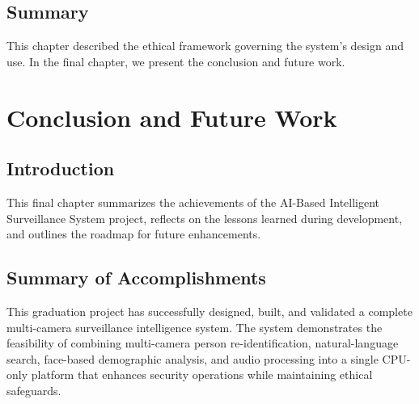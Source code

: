 \documentclass[12pt]{report}
\begin{document}
\section{Summary}
This chapter described the ethical framework governing the system's design and use. In the final chapter, we present the conclusion and future work.

\newpage

\chapter{Conclusion and Future Work}
\setcounter{section}{0}

\section{Introduction}
This final chapter summarizes the achievements of the AI-Based Intelligent Surveillance System project, reflects on the lessons learned during development, and outlines the roadmap for future enhancements.

\section{Summary of Accomplishments}
This graduation project has successfully designed, built, and validated a complete multi-camera surveillance intelligence system. The system demonstrates the feasibility of combining multi-camera person re-identification, natural-language search, face-based demographic analysis, and audio processing into a single CPU-only platform that enhances security operations while maintaining ethical safeguards.
\end{document}
